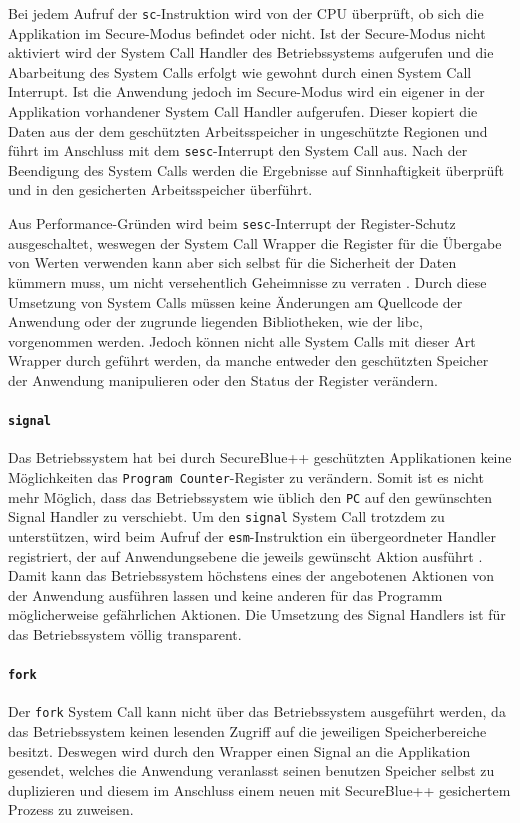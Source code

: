 \documentclass[ngerman]{sig-alternate-05-2015}
\begin{document}
Bei jedem Aufruf der \texttt{sc}-Instruktion wird von der CPU überprüft, ob sich die Applikation im Secure-Modus befindet oder nicht. Ist der Secure-Modus nicht aktiviert wird der System Call Handler des Betriebssystems aufgerufen und die Abarbeitung des System Calls erfolgt wie gewohnt durch einen System Call Interrupt. Ist die Anwendung jedoch im Secure-Modus wird ein eigener in der Applikation vorhandener System Call Handler aufgerufen. Dieser kopiert die Daten aus der dem geschützten Arbeitsspeicher in ungeschützte Regionen und führt im Anschluss mit dem \texttt{sesc}-Interrupt den System Call aus. Nach der Beendigung des System Calls werden die Ergebnisse auf Sinnhaftigkeit überprüft und in den gesicherten Arbeitsspeicher überführt. 

Aus Performance-Gründen wird beim \texttt{sesc}-Interrupt der Register-Schutz ausgeschaltet, weswegen der System Call Wrapper die Register für die Übergabe von Werten verwenden kann aber sich selbst für die Sicherheit der Daten kümmern muss, um nicht versehentlich Geheimnisse zu verraten \cite{boivie2013secureblue++:big}. Durch diese Umsetzung von System Calls müssen keine Änderungen am Quellcode der Anwendung oder der zugrunde liegenden Bibliotheken, wie der libc, vorgenommen werden. Jedoch können nicht alle System Calls mit dieser Art Wrapper durch geführt werden, da manche entweder den geschützten Speicher der Anwendung manipulieren oder den Status der Register verändern.

\paragraph{\texttt{signal}}
Das Betriebssystem hat bei durch SecureBlue++ geschützten Applikationen keine Möglichkeiten das \texttt{Program Counter}-Register zu verändern. Somit ist es nicht mehr Möglich, dass das Betriebssystem wie üblich den \texttt{PC} auf den gewünschten Signal Handler zu verschiebt. Um den \texttt{signal} System Call trotzdem zu unterstützen, wird beim Aufruf der \texttt{esm}-Instruktion ein übergeordneter Handler registriert, der auf Anwendungsebene die jeweils gewünscht Aktion ausführt \cite{boivie2013secureblue++:big}. Damit kann das Betriebssystem höchstens eines der angebotenen Aktionen von der Anwendung ausführen lassen und keine anderen für das Programm möglicherweise gefährlichen Aktionen. Die Umsetzung des Signal Handlers ist für das Betriebssystem völlig transparent.

\paragraph{\texttt{fork}}
Der \texttt{fork} System Call kann nicht über das Betriebssystem ausgeführt werden, da das Betriebssystem keinen lesenden Zugriff auf die jeweiligen Speicherbereiche besitzt. Deswegen wird durch den Wrapper einen Signal an die Applikation gesendet, welches die Anwendung veranlasst seinen benutzen Speicher selbst zu duplizieren und diesem im Anschluss einem neuen mit SecureBlue++ gesichertem Prozess zu zuweisen.
\end{document}
